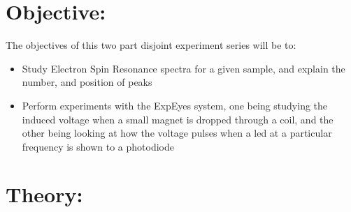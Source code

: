 \begin{Abstract:}
\begin{Abstract:}
\section{Objective:}
The objectives of this two part disjoint experiment series will be to:
\begin{itemize}
	\item Study Electron Spin Resonance spectra for a given sample, and explain the number, and position of peaks
	\item Perform experiments with the ExpEyes system, one being studying the induced voltage when a small magnet is dropped through a coil, and the other being looking at how the voltage pulses when a led at a particular frequency is shown to a photodiode
\end{itemize}

\section{Theory:}

\end{Abstract:}
\end{Abstract:}
